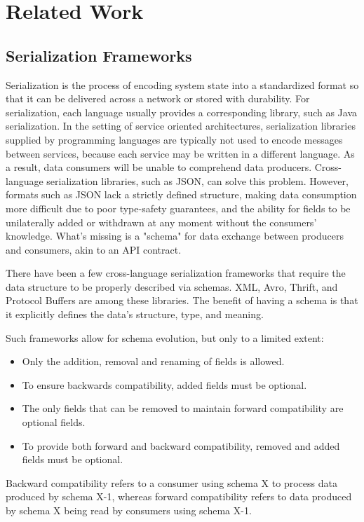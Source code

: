 
%

\chapter{Related Work}
\label{cha:related_work}

\section{Serialization Frameworks} %
\label{sec:serialization_frameworks}

Serialization is the process of encoding system state into a standardized format so that it can be delivered across a network or stored with durability.
For serialization, each language usually provides a corresponding library, such as Java serialization.
In the setting of service oriented architectures, serialization libraries supplied by programming languages are typically not used to encode messages between services,
because each service may be written in a different language. As a result, data consumers will be unable to comprehend data producers.
Cross-language serialization libraries, such as JSON, can solve this problem.
However, formats such as JSON lack a strictly defined structure,
making data consumption more difficult due to poor type-safety guarantees, and the ability for fields to be unilaterally added or withdrawn at any moment without the consumers' knowledge.
What's missing is a "schema" for data exchange between producers and consumers, akin to an API contract.

There have been a few cross-language serialization frameworks that require the data structure to be properly described via schemas.
XML, Avro, Thrift, and Protocol Buffers are among these libraries.
The benefit of having a schema is that it explicitly defines the data's structure, type, and meaning.

Such frameworks allow for schema evolution, but only to a limited extent:
\begin{itemize}
    \item Only the addition, removal and renaming of fields is allowed.
    \item To ensure backwards compatibility, added fields must be optional.
    \item The only fields that can be removed to maintain forward compatibility are optional fields.
    \item To provide both forward and backward compatibility, removed and added fields must be optional.
\end{itemize}
Backward compatibility refers to a consumer using schema X to process data produced by schema X-1,
whereas forward compatibility refers to data produced by schema X being read by consumers using schema X-1.

